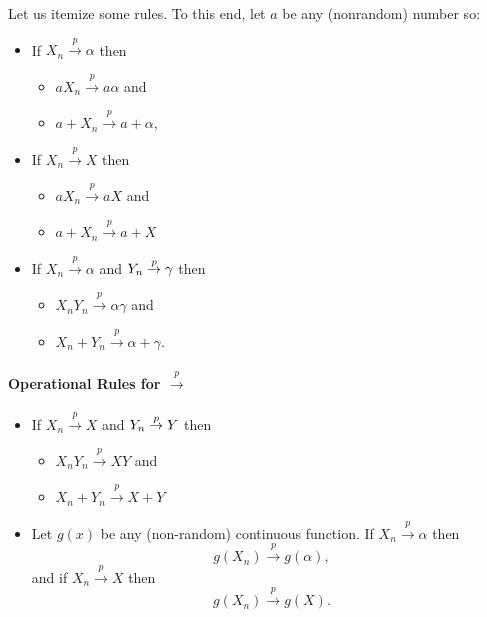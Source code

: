 \documentclass[notes=show,smaller,handout]{beamer}\usepackage[]{graphicx}\usepackage[]{color}
\begin{document}
\begin{frame}{\secname}

  Let us itemize some rules. To this end, let $a$ be any (nonrandom) number so:

  \begin{itemize}
  \item If $X_{n}\overset{p}{\rightarrow }%
  \alpha $ then \medskip
  \begin{itemize}
  \item $aX_{n}\overset{p}{\rightarrow }a\alpha $ and \medskip
  \item $a+X_{n}\overset{p}{\rightarrow }a+\alpha$,
  \end{itemize}

  \bigskip
  \item If $X_{n}\overset{p}{\rightarrow }X $ then \medskip
  \begin{itemize}
  \item $aX_{n}\overset{p}{\rightarrow }aX $ and \medskip
  \item $a+X_{n}\overset{p}{\rightarrow }a+X $
  \end{itemize}

  \bigskip
  \item If $X_{n}\overset{p}{\rightarrow }\alpha $ and $Y_{n}\overset{p}{%
  \rightarrow }\gamma $ then \medskip
  \begin{itemize}
  \item $X_{n}Y_{n}\overset{p}{\rightarrow }\alpha \gamma$ and \medskip
  \item $X_{n}+Y_{n}\overset{p}{\rightarrow }\alpha +\gamma$.
  \end{itemize}
  \end{itemize}
\end{frame}

\begin{frame}{\secname}
  \framesubtitle{Operational Rules for $\overset{p}{\rightarrow }$}

  \begin{itemize}
  \item If $X_{n}\overset{p}{\rightarrow }X $ and $Y_{n}\overset{p}{%
  \rightarrow }Y $ then  \medskip

  \begin{itemize}
  \item $X_{n}Y_{n}\overset{p}{\rightarrow }X Y$ and  \medskip

  \item $X_{n}+Y_{n}\overset{p}{\rightarrow }X +Y$
  \end{itemize}

   \medskip

  \item Let $g\left( x\right) $ be any (non-random) continuous function. If $%
  X_{n}\overset{p}{\rightarrow }\alpha $ then
  $$
  g\left( X_{n}\right) \overset{p}{\rightarrow }g\left( \alpha \right),
  $$
  and if $X_{n}\overset{p}{\rightarrow }X $ then
  $$g\left( X_{n}\right) \overset{p}{\rightarrow }g\left( X \right).
  $$
  \end{itemize}
\end{frame}
\end{document}
